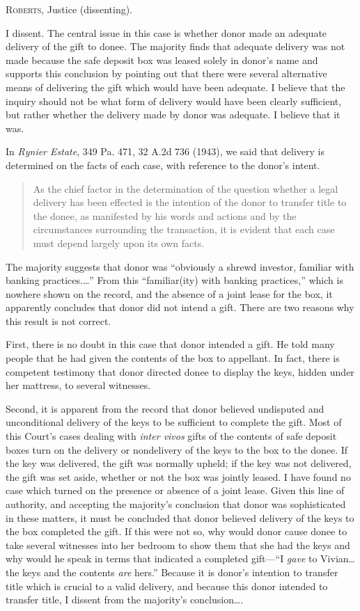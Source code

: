 \opinion \textsc{Roberts}, Justice (dissenting).

I dissent. The central issue in this case is whether donor made an adequate
delivery of the gift to donee. The majority finds that adequate delivery was
not made because the safe deposit box was leased solely in donor's name and
supports this conclusion by pointing out that there were several alternative
means of delivering the gift which would have been adequate. I believe that the
inquiry should not be what form of delivery would have been clearly sufficient,
but rather whether the delivery made by donor was adequate. I believe that it
was.

 In \emph{Rynier Estate}, 349 Pa. 471, 32 A.2d 736 (1943), we said that delivery
is
determined on the facts of each case, with reference to the donor's intent.
\begin{quote}
As the chief factor in the determination of the question whether a legal
delivery has been effected is the intention of the donor to transfer title to
the donee, as manifested by his words and actions and by the circumstances
surrounding the transaction, it is evident that each case must depend largely
upon its own facts.
\end{quote}

The majority suggests that donor was ``obviously a shrewd investor,
familiar with banking practices.\ldots'' From this ``familiar(ity) with banking
practices,'' which is nowhere shown on the record, and the absence of a joint
lease for the box, it apparently concludes that donor did not intend a gift.
There are two reasons why this result is not correct.

 First, there is no doubt in this case that donor intended a gift. He told many
people that he had given the contents of the box to appellant. In fact, there
is competent testimony that donor directed donee to display the keys, hidden
under her mattress, to several witnesses.

Second, it is apparent from the record that donor believed undisputed and
unconditional delivery of the keys to be sufficient to complete the gift. Most
of this Court's cases dealing with \textit{inter vivos} gifts of the contents
of safe deposit boxes turn on the delivery or nondelivery of the keys to the
box to the donee. If the key was delivered, the gift was normally upheld; if
the key was not delivered, the gift was set aside, whether or not the box was
jointly leased. I have found no case which turned on the presence or absence of
a joint lease. Given this line of authority, and accepting the majority's
conclusion that donor was sophisticated in these matters, it must be concluded
that donor believed delivery of the keys to the box completed the gift. If this
were not so, why would donor cause donee to take several witnesses into her
bedroom to show them that she had the keys and why would he speak in terms that
indicated a completed gift---``I \textit{gave} to Vivian\ldots the keys and the
contents \textit{are} hers.'' Because it is donor's intention to transfer title
which is crucial to a valid delivery, and because this donor intended to
transfer title, I dissent from the majority's conclusion\dots.

